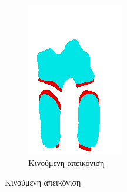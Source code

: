 \documentclass[a4paper,12pt]{article}
\begin{document}
\begin{figure}[H]
\begin{subfigure}[t]{0.4\linewidth}
    \includegraphics[width=\linewidth]{moving_label_before_registration_2.png}
    \caption{Κινούμενη απεικόνιση}
    \end{subfigure}


\end{figure}
\end{document}
